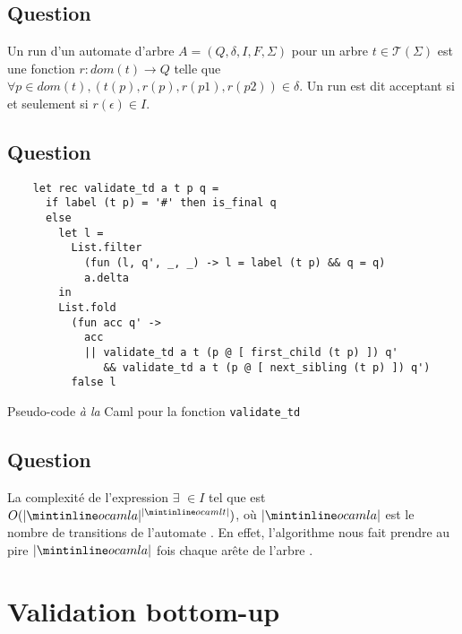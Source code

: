 \documentclass[twoside,12pt]{article}
\begin{document}
\subsection{Question}

Un run d'un automate d'arbre $A = (Q, \delta, I, F, \Sigma)$
pour un arbre $t \in {\mathcal{T}}(\Sigma)$
est une fonction $r : dom(t) \to Q$
telle que $\forall p \in dom(t), (t(p), r(p), r(p1),r(p2)) \in \delta$.
Un run est dit acceptant si et seulement si $r (\epsilon) \in I$.

\subsection{Question}

\begin{algorithm}
    \bigskip
  \begin{verbatim}
    let rec validate_td a t p q =
      if label (t p) = '#' then is_final q
      else
        let l =
          List.filter
            (fun (l, q', _, _) -> l = label (t p) && q = q)
            a.delta
        in
        List.fold
          (fun acc q' ->
            acc
            || validate_td a t (p @ [ first_child (t p) ]) q'
               && validate_td a t (p @ [ next_sibling (t p) ]) q')
          false l
   \end{verbatim}
   \caption{\small Pseudo-code \textit{à la} Caml pour la fonction \texttt{validate\_td}}
\end{algorithm}

\subsection{Question}

La complexité de l'expression
$\exists$  $\in I$ tel que 
est $O(|\ocaml{a}|^{|\ocaml{t}|})$, où $|\ocaml{a}|$ est le nombre de
transitions de l'automate . En effet, l'algorithme
nous fait prendre au pire $|\ocaml{a}|$ fois chaque arête de l'arbre .


\section{Validation bottom-up}
\end{document}
